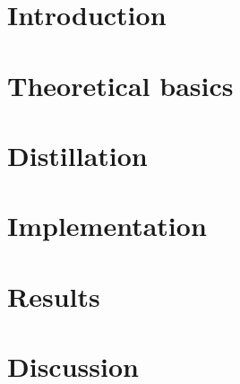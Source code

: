 \documentclass{style}
\begin{document}
    
    

    \tableofcontents
    
    \newpage

    \section{Introduction}
    
    
    
    \newpage
	\section{Theoretical basics}
	
	
	
	

    \newpage
	
	
	
	\newpage
	
	\section{Distillation}
	
	
	
	\newpage
	\section{Implementation}\label{section:implementation}
	
	
	
	\newpage
	\section{Results}\label{section:results}
	
	
	
	\newpage
	\section{Discussion}
	
	
	
	\newpage
	
	
\end{document}
